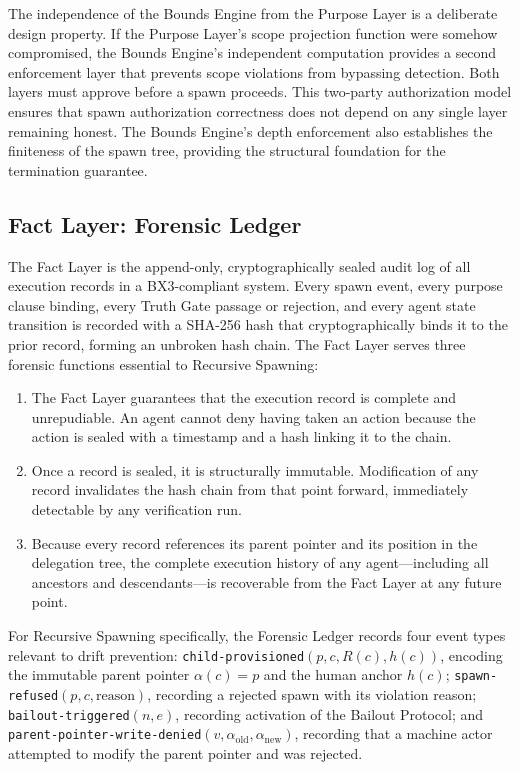 The independence of the Bounds Engine from the Purpose Layer is a deliberate design property. If the Purpose Layer's scope projection function were somehow compromised, the Bounds Engine's independent computation provides a second enforcement layer that prevents scope violations from bypassing detection. Both layers must approve before a spawn proceeds. This two-party authorization model ensures that spawn authorization correctness does not depend on any single layer remaining honest. The Bounds Engine's depth enforcement also establishes the finiteness of the spawn tree, providing the structural foundation for the termination guarantee.

\subsection{Fact Layer: Forensic Ledger}

The Fact Layer is the append-only, cryptographically sealed audit log of all execution records in a BX3-compliant system. Every spawn event, every purpose clause binding, every Truth Gate passage or rejection, and every agent state transition is recorded with a SHA-256 hash that cryptographically binds it to the prior record, forming an unbroken hash chain. The Fact Layer serves three forensic functions essential to Recursive Spawning:

\begin{enumerate}
  \item[\textbf{Completeness.}] The Fact Layer guarantees that the execution record is complete and unrepudiable. An agent cannot deny having taken an action because the action is sealed with a timestamp and a hash linking it to the chain.
  \item[\textbf{Immutability.}] Once a record is sealed, it is structurally immutable. Modification of any record invalidates the hash chain from that point forward, immediately detectable by any verification run.
  \item[\textbf{Reconstructability.}] Because every record references its parent pointer and its position in the delegation tree, the complete execution history of any agent---including all ancestors and descendants---is recoverable from the Fact Layer at any future point.
\end{enumerate}

For Recursive Spawning specifically, the Forensic Ledger records four event types relevant to drift prevention: \texttt{child-provisioned}$(p, c, R(c), h(c))$, encoding the immutable parent pointer $\alpha(c) = p$ and the human anchor $h(c)$; \texttt{spawn-refused}$(p, c, \text{reason})$, recording a rejected spawn with its violation reason; \texttt{bailout-triggered}$(n, e)$, recording activation of the Bailout Protocol; and \texttt{parent-pointer-write-denied}$(v, \alpha_{\text{old}}, \alpha_{\text{new}})$, recording that a machine actor attempted to modify the parent pointer and was rejected.

